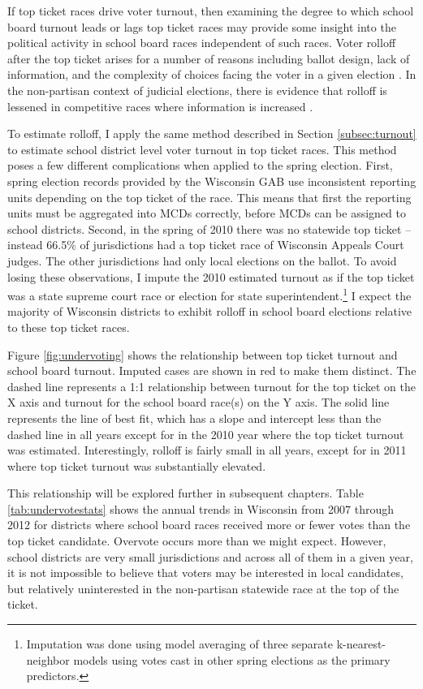 If top ticket races drive voter turnout, then examining the degree to which school 
board turnout leads or lags top ticket races may provide some insight into the 
political activity in school board races independent of such races. Voter rolloff 
after the top ticket arises for a number of reasons including ballot design, 
lack of information, and the complexity of choices facing the voter in a given 
election \citep{wattenberg00}. In the non-partisan context of judicial elections, 
there is evidence that rolloff is lessened in competitive races where information 
is increased \citep{streb09}. 

To estimate rolloff, I apply the same method described in Section 
\ref{subsec:turnout} to 
estimate school district level voter turnout in top ticket races. This method 
poses a few different complications when applied 
to the spring election. First, spring election records provided by the Wisconsin 
GAB use inconsistent reporting units depending on the top ticket of the race. This 
means that first the reporting units must be aggregated into MCDs correctly, before 
MCDs can be assigned to school districts. Second, in the spring of 2010 there was no 
statewide top ticket -- instead 
66.5\% of jurisdictions 
had a top ticket race of Wisconsin Appeals Court judges. The other jurisdictions 
had only local elections on the ballot. To avoid losing these observations, I impute 
the 2010 estimated turnout as if the top ticket was a state supreme court race or 
election for state superintendent.\footnote{Imputation was done using model averaging 
of three separate k-nearest-neighbor models using votes cast in other spring 
elections as the primary predictors.} I expect the majority of Wisconsin 
districts to exhibit rolloff in school board elections relative to these 
top ticket races. 

Figure \ref{fig:undervoting} shows the relationship between top ticket turnout 
and school board turnout. Imputed cases are shown in red to make them distinct. The 
dashed line represents a 1:1 relationship between turnout for the top ticket on the 
X axis and turnout for the school board race(s) on the Y axis. The solid line represents 
the line of best fit, which has a slope and intercept less than the dashed line 
in all years except for in the 2010 year where the top ticket turnout was estimated. 
Interestingly, rolloff is fairly small in all years, except for in 2011 where 
top ticket turnout was substantially elevated. 

This relationship will be explored further in subsequent chapters. Table 
\ref{tab:undervotestats} shows the annual trends in Wisconsin from 2007 through 
2012 for districts where school board races received more or fewer votes than the 
top ticket candidate. Overvote occurs more than we might expect. However, school 
districts are very small jurisdictions and across all of them in a given year, it 
is not impossible to believe that voters may be interested in local candidates, but 
relatively uninterested in the non-partisan statewide race at the top of the ticket. 

